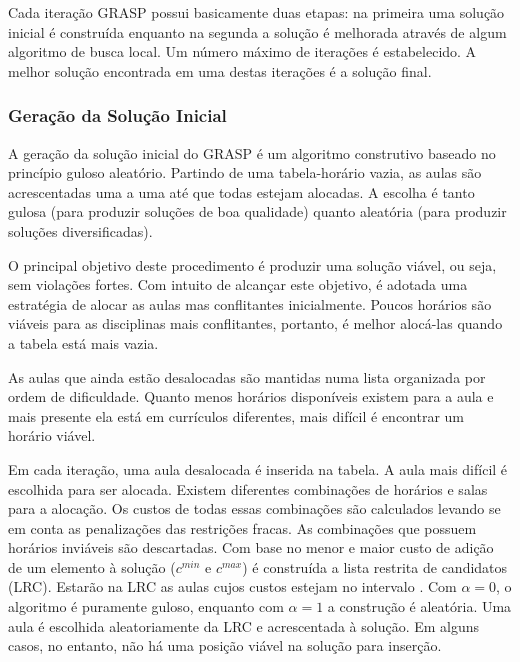\documentclass[11pt]{article}
\begin{document}
Cada iteração GRASP \cite{grasp_resende_ribeiro} possui basicamente duas etapas: na primeira uma solução inicial é construída enquanto na segunda a solução é melhorada através de algum algoritmo de busca local. Um número máximo de iterações é estabelecido. A melhor solução encontrada em uma destas iterações é a solução final.

\subsubsection{Geração da Solução Inicial}

A geração da solução inicial do GRASP é um algoritmo construtivo baseado no princípio guloso aleatório. Partindo de uma tabela-horário vazia, as aulas são acrescentadas uma a uma até que todas estejam alocadas. A escolha é tanto gulosa (para produzir soluções de boa qualidade) quanto aleatória (para produzir soluções diversificadas).

O principal objetivo deste procedimento é produzir uma solução viável, ou seja, sem violações fortes. Com intuito de alcançar este objetivo, é adotada uma estratégia de alocar as aulas mas conflitantes inicialmente. Poucos horários são viáveis para as disciplinas mais conflitantes, portanto, é melhor alocá-las quando a tabela está mais vazia.

As aulas que ainda estão desalocadas são mantidas numa lista organizada por ordem de dificuldade. Quanto menos horários disponíveis existem para a aula e mais presente ela está em currículos diferentes, mais difícil é encontrar um horário viável.

Em cada iteração, uma aula desalocada é inserida na tabela. A aula mais difícil é escolhida para ser alocada. Existem diferentes combinações de horários e salas para a alocação. Os custos de todas essas combinações são calculados levando se em conta as penalizações das restrições fracas. As combinações que possuem horários inviáveis são descartadas. Com base no menor e maior custo de adição de um elemento à solução ($c^{min}$ e $c^{max}$) é construída a lista restrita de candidatos (LRC). Estarão na LRC as aulas cujos custos estejam no intervalo \begin{math} [c^{min}, c^{min}+\alpha(c^{max} - c^{min})]\end{math}. Com $\alpha=0$, o algoritmo é puramente guloso, enquanto com $\alpha=1$ a construção é aleatória. Uma aula é escolhida aleatoriamente da LRC e acrescentada à solução. Em alguns casos, no entanto, não há uma posição viável na solução para inserção. 
\end{document}
